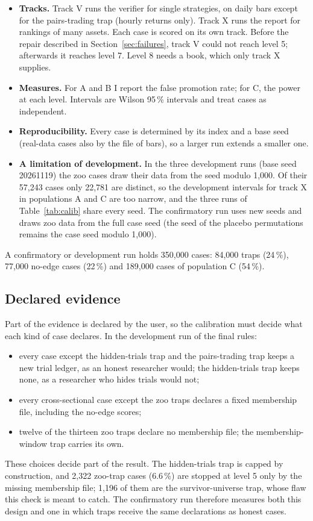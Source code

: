 \documentclass[11pt]{article}
\begin{document}
\begin{itemize}
\item \textbf{Tracks.} Track V runs the verifier for single strategies, on daily bars except for the pairs-trading trap
(hourly returns only). Track X runs the report for rankings of many assets. Each case is scored on its own track.
Before the repair described in Section~\ref{sec:failures}, track V could not reach level 5; afterwards it reaches level
7. Level 8 needs a book, which only track X supplies.
\item \textbf{Measures.} For A and B I report the false promotion rate; for C, the power at each level. Intervals are
Wilson 95\,\% intervals and treat cases as independent.
\item \textbf{Reproducibility.} Every case is determined by its index and a base seed (real-data cases also by the file
of bars), so a larger run extends a smaller one.
\item \textbf{A limitation of development.} In the three development runs (base seed 20261119) the zoo cases draw their
data from the seed modulo 1,000. Of their 57,243 cases only 22,781 are distinct, so the development intervals for track
X in populations A and C are too narrow, and the three runs of Table~\ref{tab:calib} share every seed. The confirmatory
run uses new seeds and draws zoo data from the full case seed (the seed of the placebo permutations remains the case
seed modulo 1,000).
\end{itemize}

A confirmatory or development run holds 350,000 cases: 84,000 traps (24\,\%), 77,000 no-edge cases (22\,\%) and 189,000
cases of population C (54\,\%).

\subsection{Declared evidence}\label{sec:declared}

Part of the evidence is declared by the user, so the calibration must decide what each kind of case declares. In the
development run of the final rules:
\begin{itemize}
\item every case except the hidden-trials trap and the pairs-trading trap keeps a new trial ledger, as an honest
researcher would; the hidden-trials trap keeps none, as a researcher who hides trials would not;
\item every cross-sectional case except the zoo traps declares a fixed membership file, including the no-edge scores;
\item twelve of the thirteen zoo traps declare no membership file; the membership-window trap carries its own.
\end{itemize}
These choices decide part of the result. The hidden-trials trap is capped by construction, and 2,322 zoo-trap cases
(6.6\,\%) are stopped at level 5 only by the missing membership file; 1,196 of them are the survivor-universe trap, whose
flaw this check is meant to catch. The confirmatory run therefore measures both this design and one in which traps
receive the same declarations as honest cases.
\end{document}

